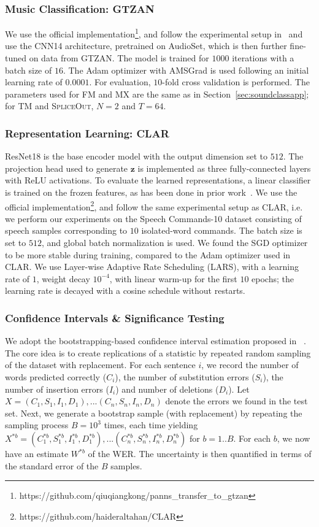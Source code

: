 \documentclass{article}
\newcommand{\SpA}{{\textsc{SpliceOut}}\xspace}
\begin{document}
\subsubsection{Music Classification: GTZAN}
We use the official implementation\footnote{https://github.com/qiuqiangkong/panns\_transfer\_to\_gtzan}, and follow the experimental setup in~\citep{panns} and use the CNN14 architecture, pretrained on AudioSet, which is then further fine-tuned on data from GTZAN. The model is trained for $1000$ iterations with a batch size of $16$. The Adam optimizer with AMSGrad is used following an initial learning rate of $0.0001$. For evaluation, $10$-fold cross validation is performed. The parameters used for FM and MX are the same as in Section~\ref{sec:soundclassapp}; for TM and \SpA, $N=2$ and $T=64$. 

\subsubsection{Representation Learning: CLAR}
ResNet18 is the base encoder model with the output dimension set to $512$. The projection head used to generate $\mathbf{z}$ is implemented as three fully-connected layers with ReLU activations. To evaluate the learned representations, a linear classifier is trained on the frozen features, as has been done in prior work~\citep{grill2020bootstrap,chen2020exploring,zbontar2021barlow,chen2020simple}. We use the official implementation\footnote{https://github.com/haideraltahan/CLAR}, and follow the same experimental setup as CLAR, i.e. we perform our experiments on the Speech Commands-10 dataset consisting of speech samples corresponding to $10$ isolated-word commands. The batch size is set to $512$, and global batch normalization is used.%
We found the SGD optimizer to be more stable during training, compared to the Adam optimizer used in CLAR. We use Layer-wise Adaptive Rate Scheduling (LARS), with a learning rate of $1$, weight decay $10^{-4}$, with linear warm-up for the first $10$ epochs; the learning rate is decayed with a cosine schedule without restarts.

\subsubsection{Confidence Intervals \& Significance Testing}
We adopt the bootstrapping-based confidence interval estimation proposed in ~\citep{bootstrap}. The core idea is to create replications of a statistic by repeated random sampling of the dataset with replacement. For each sentence $i$, we record the number of words predicted correctly ($C_i$), the number of substitution errors ($S_i$), the number of insertion errors ($I_i$) and number of deletions ($D_i$). Let $X = (C_1, S_1, I_1, D_1),...(C_n, S_n, I_n, D_n)$ denote the errors we found in the test set. Next, we generate a bootstrap sample (with replacement) by repeating the sampling process $B=10^3$ times, each time yielding $X^{*b}=(C_1^{*b}, S_1^{*b}, I_1^{*b}, D_1^{*b}),...(C_n^{*b}, S_n^{*b}, I_n^{*b}, D_n^{*b})$ for $b=1..B$. For each $b$, we now have an estimate $W^{*b}$ of the WER. The uncertainty is then quantified in terms of the standard error of the $B$ samples.
\end{document}
